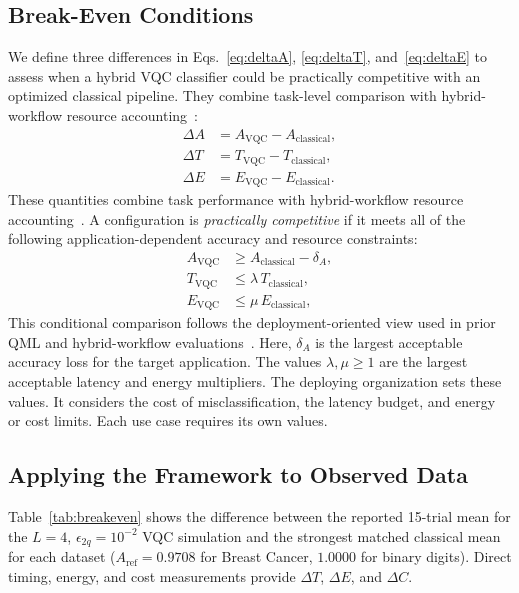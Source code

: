 \documentclass[final,5p,times,number]{elsarticle}
\begin{document}
\subsection{Break-Even Conditions}
\label{sec:breakeven}

We define three differences in Eqs.~\eqref{eq:deltaA}, \eqref{eq:deltaT}, and~\eqref{eq:deltaE} to assess when a hybrid VQC classifier could be practically competitive with an optimized classical pipeline. They combine task-level comparison with hybrid-workflow resource accounting~\cite{huang2021power,laurent2021orchestrating,parsa2022workflow}:
\begin{align}
  \Delta A &= A_{\text{VQC}} - A_{\text{classical}}, \label{eq:deltaA}\\
  \Delta T &= T_{\text{VQC}} - T_{\text{classical}}, \label{eq:deltaT}\\
  \Delta E &= E_{\text{VQC}} - E_{\text{classical}}. \label{eq:deltaE}
\end{align}
These quantities combine task performance with hybrid-workflow resource accounting~\cite{huang2021power,laurent2021orchestrating,parsa2022workflow}. A configuration is \emph{practically competitive} if it meets all of the following application-dependent accuracy and resource constraints:
\begin{align}
  A_{\text{VQC}} &\geq A_{\text{classical}} - \delta_A, \label{eq:cond_acc}\\
  T_{\text{VQC}} &\leq \lambda\, T_{\text{classical}}, \label{eq:cond_lat}\\
  E_{\text{VQC}} &\leq \mu\, E_{\text{classical}}, \label{eq:cond_energy}
\end{align}
This conditional comparison follows the deployment-oriented view used in prior QML and hybrid-workflow evaluations~\cite{huang2021power,laurent2021orchestrating,parsa2022workflow}. Here, $\delta_A$ is the largest acceptable accuracy loss for the target application. The values $\lambda,\mu \geq 1$ are the largest acceptable latency and energy multipliers. The deploying organization sets these values. It considers the cost of misclassification, the latency budget, and energy or cost limits. Each use case requires its own values.

\subsection{Applying the Framework to Observed Data}

Table~\ref{tab:breakeven} shows the difference between the reported 15-trial mean for the $L=4$, $\epsilon_{2q}=10^{-2}$ VQC simulation and the strongest matched classical mean for each dataset ($A_{\mathrm{ref}}=0.9708$ for Breast Cancer, $1.0000$ for binary digits). Direct timing, energy, and cost measurements provide $\Delta T$, $\Delta E$, and $\Delta C$.
\end{document}
